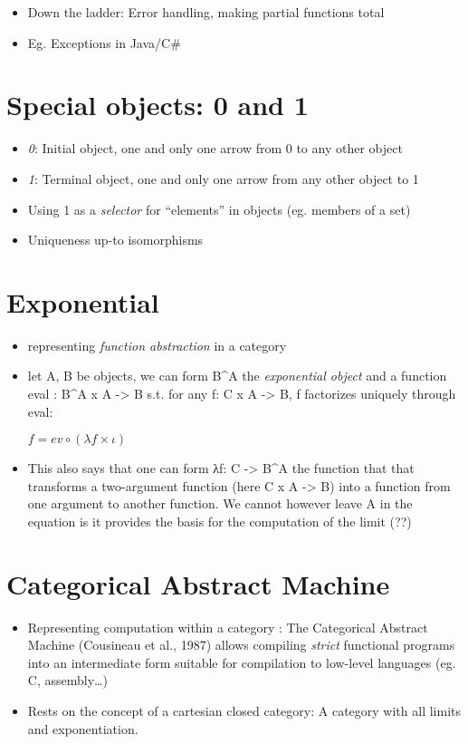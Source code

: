 \documentclass{article}
\begin{document}
\begin{itemize}
\item
  Down the ladder: Error handling, making partial functions total
\item
  Eg. Exceptions in Java/C\#
\end{itemize}
\section{Special objects: 0 and 1}

\begin{itemize}
\item
  \emph{0}: Initial object, one and only one arrow from 0 to any other
  object
\item
  \emph{1}: Terminal object, one and only one arrow from any other
  object to 1
\item
  Using 1 as a \emph{selector} for ``elements'' in objects (eg. members
  of a set)
\item
  Uniqueness up-to isomorphisms
\end{itemize}
\section{Exponential}

\begin{itemize}
\item
  representing \emph{function abstraction} in a category
\item
  let A, B be objects, we can form B\^{}A the \emph{exponential object}
  and a function eval : B\^{}A x A -\textgreater{} B s.t. for any f: C x
  A -\textgreater{} B, f factorizes uniquely through eval:

  $f = ev ∘ (λf × ι)$
\item
  This also says that one can form λf: C -\textgreater{} B\^{}A the
  function that that transforms a two-argument function (here C x A
  -\textgreater{} B) into a function from one argument to another
  function. We cannot however leave A in the equation is it provides the
  basis for the computation of the limit (??)
\end{itemize}
\section{Categorical Abstract Machine}

\begin{itemize}
\item
  Representing computation within a category : The Categorical Abstract
  Machine (Cousineau et al., 1987) allows compiling \emph{strict}
  functional programs into an intermediate form suitable for compilation
  to low-level languages (eg. C, assembly\ldots{})
\item
  Rests on the concept of a cartesian closed category: A category with
  all limits and exponentiation.
\end{itemize}
\end{document}
